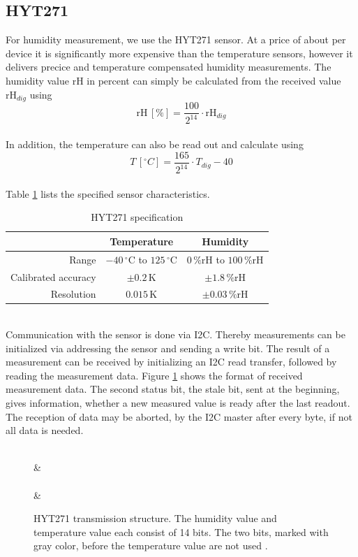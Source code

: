 \documentclass[a4paper]{scrreprt}
\begin{document}
\subsection{HYT271}
For humidity measurement, we use the HYT271 sensor. At a price of about  per device it is significantly more expensive than the temperature sensors, however it delivers precice and temperature compensated humidity measurements. 
The humidity value rH in percent can simply be calculated from the received value $\mathrm{rH}_{dig}$ using
$$\mathrm{rH}\,[\%] = \frac{100}{2^{14}} \cdot  \mathrm{rH}_{dig}$$\\
In addition, the temperature can also be read out and calculate using 
$$T\,[^{\circ} C] = \frac{165}{2^{14}} \cdot  T_{dig} - 40$$\\
Table \ref{tab:hyt} lists the specified sensor characteristics.
\begin{table}[Hh!]
	\centering
	\begin{tabular}{| r | c | c |}
		\hline
    &Temperature & Humidity\\
		\hline
		\hline
    Range & $-40\,^{\circ}\mathrm{C}$ to $125\,^{\circ}\mathrm{C}$ & $0\, \mathrm {\%rH}$ to $100\, \mathrm {\%rH}$\\
		\hline
    Calibrated accuracy & $\pm 0.2\,\mathrm{K}$ & $\pm 1.8\, \mathrm {\%rH}$   \\
		\hline
    Resolution & $0.015\,\mathrm{K}$ & $\pm 0.03\, \mathrm {\%rH}$ \\
		\hline
	\end{tabular}
  \caption{HYT271 specification \cite{hyt}}
	\label{tab:hyt}
\end{table}\\
Communication with the sensor is done via I2C. Thereby measurements can be initialized via addressing the sensor and sending a write bit. The result of a measurement can be received by initializing an I2C read transfer, followed by reading the measurement data. Figure \ref{fig:hyt_transmission} shows the format of received measurement data. The second status bit, the stale bit, sent at the beginning, gives information, whether a new measured value is ready after the last readout. The reception of data may be aborted, by the I2C master after every byte, if not all data is needed.
\begin{figure}[Hh!]
	\centering
	\begin{bytefield}[endianness=big, bitwidth=2.1em]{8}
		\\
     & \\
    \\
     & \\
	\end{bytefield}
  \caption{HYT271 transmission structure. The humidity value and temperature value each consist of 14 bits. The two bits, marked with gray color, before the temperature value are not used \cite{hyt2}.}
	\label{fig:hyt_transmission}
\end{figure}\\
\end{document}
